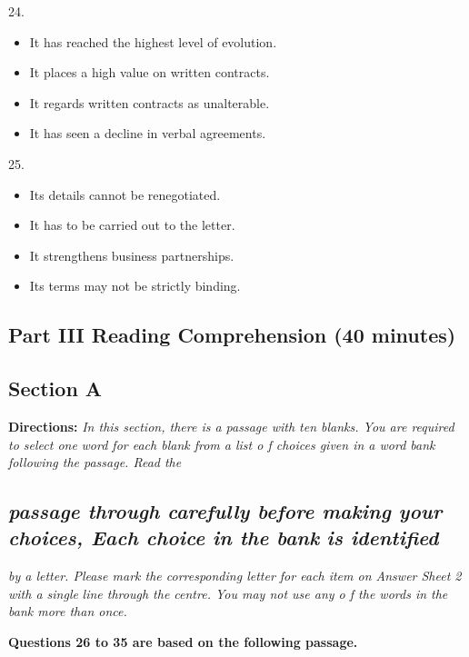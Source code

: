 \documentclass[UTF8,11pt]{ctexart}
\begin{document}
24.


\begin{itemize}[leftmargin=2em,itemsep=.2em,topsep=.4em]\item[A.] It has reached the highest level of evolution.
\item[B.] It places a high value on written contracts.
\item[C.] It regards written contracts as unalterable.
\item[D.] It has seen a decline in verbal agreements.
\end{itemize}

25.


\begin{itemize}[leftmargin=2em,itemsep=.2em,topsep=.4em]\item[A.] Its details cannot be renegotiated.
\item[B.] It has to be carried out to the letter.
\item[C.] It strengthens business partnerships.
\item[D.] Its terms may not be strictly binding.
\end{itemize}

\subsection*{\textbf{Part III} \textbf{Reading Comprehension} \textbf{(40 minutes)}}


\subsection*{\textbf{Section A}}


\textbf{Directions: }\textit{In this section, there is a passage with ten blanks. You are required to select one} \textit{word for each blank from a list o f choices given in a word bank following the passage. Read the}


\subsection*{\textit{passage through carefully before making your choices, Each choice in the bank} \textit{is identified}}


\textit{by a letter. Please mark the corresponding letter for each item on Answer Sheet 2 with a single} \textit{line through the centre. You may not use any o f the words in the bank more than once.}


\textbf{Questions 26 to 35 are based on the following passage.}
\end{document}
